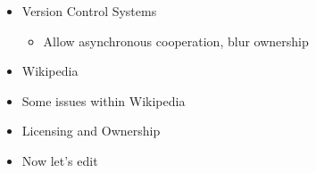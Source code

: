 \documentclass[a4paper,landscape,headrule,footrule,xetex]{foils}
\begin{document}
\MyLogo{}
\begin{itemize}
\item Version Control Systems
  \begin{itemize}
  \item Allow asynchronous cooperation, blur ownership
  \end{itemize}
\item Wikipedia
\item Some issues within Wikipedia
\item Licensing and Ownership 
\end{itemize}



\begin{itemize}
\item Now let's edit
\end{itemize}
\end{document}
